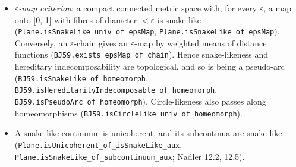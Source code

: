 \documentclass[11pt]{article}
\newcommand{\lean}[1]{\texttt{#1}}
\begin{document}
\begin{itemize}
  \item \emph{$\varepsilon$-map criterion}: a compact connected metric space with, for every $\varepsilon$, a map onto [0, 1] with fibres of diameter $< \varepsilon$ is snake-like (\lean{Plane.\hspace{0pt}isSnakeLike\_\hspace{0pt}univ\_\hspace{0pt}of\_\hspace{0pt}epsMap}, \lean{Plane.\hspace{0pt}isSnakeLike\_\hspace{0pt}of\_\hspace{0pt}epsMap}). Conversely, an $\varepsilon$-chain gives an $\varepsilon$-map by weighted means of distance functions (\lean{BJ59.\hspace{0pt}exists\_\hspace{0pt}epsMap\_\hspace{0pt}of\_\hspace{0pt}chain}). Hence snake-likeness and hereditary indecomposability are topological, and so is being a pseudo-arc (\lean{BJ59.\hspace{0pt}isSnakeLike\_\hspace{0pt}of\_\hspace{0pt}homeomorph}, \lean{BJ59.\hspace{0pt}isHereditarilyIndecomposable\_\hspace{0pt}of\_\hspace{0pt}homeomorph}, \lean{BJ59.\hspace{0pt}isPseudoArc\_\hspace{0pt}of\_\hspace{0pt}homeomorph}). Circle-likeness also passes along homeomorphisms (\lean{BJ59.\hspace{0pt}isCircleLike\_\hspace{0pt}univ\_\hspace{0pt}of\_\hspace{0pt}homeomorph}).
  \item A snake-like continuum is unicoherent, and its subcontinua are snake-like (\lean{Plane.\hspace{0pt}isUnicoherent\_\hspace{0pt}of\_\hspace{0pt}isSnakeLike\_\hspace{0pt}aux}, \lean{Plane.\hspace{0pt}isSnakeLike\_\hspace{0pt}of\_\hspace{0pt}subcontinuum\_\hspace{0pt}aux}; Nadler 12.2, 12.5).

\end{itemize}
\end{document}
